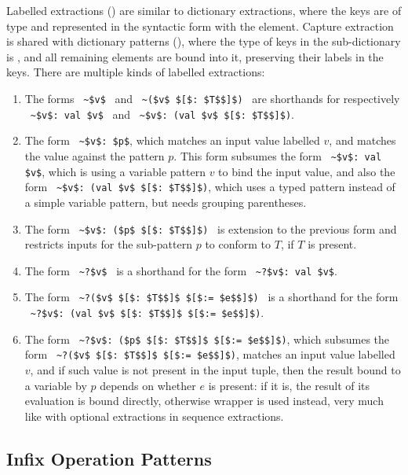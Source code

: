 Labelled extractions () are similar to dictionary extractions, where the keys are of type  and represented in the syntactic form with the  element. Capture extraction is shared with dictionary patterns (), where the type of keys in the sub-dictionary is , and all remaining elements are bound into it, preserving their labels in the keys. There are multiple kinds of labelled extractions: 
\begin{enumerate}
  \item The forms ~\lstinline!~$v$!~ and ~\lstinline!~($v$ $[$: $T$$]$)!~ are shorthands for respectively ~\lstinline!~$v$: val $v$!~ and ~\lstinline!~$v$: (val $v$ $[$: $T$$]$)!. 
  \item The form ~\lstinline!~$v$: $p$!, which matches an input value labelled $v$, and matches the value against the pattern $p$. This form subsumes the form ~\lstinline!~$v$: val $v$!, which is using a variable pattern $v$ to bind the input value, and also the form ~\lstinline!~$v$: (val $v$ $[$: $T$$]$)!, which uses a typed pattern instead of a simple variable pattern, but needs grouping parentheses. 
  \item The form ~\lstinline!~$v$: ($p$ $[$: $T$$]$)!~ is extension to the previous form and restricts inputs for the sub-pattern $p$ to conform to $T$, if $T$ is present. 
  \item The form ~\lstinline!~?$v$!~ is a shorthand for the form ~\lstinline!~?$v$: val $v$!. 
  \item The form ~\lstinline!~?($v$ $[$: $T$$]$ $[$:= $e$$]$)!~ is a shorthand for the form ~\lstinline!~?$v$: (val $v$ $[$: $T$$]$ $[$:= $e$$]$)!. 
  \item The form ~\lstinline!~?$v$: ($p$ $[$: $T$$]$ $[$:= $e$$]$)!, which subsumes the form ~\lstinline!~?($v$ $[$: $T$$]$ $[$:= $e$$]$)!, matches an input value labelled $v$, and if such value is not present in the input tuple, then the result bound to a variable by $p$ depends on whether $e$ is present: if it is, the result of its evaluation is bound directly, otherwise  wrapper is used instead, very much like with optional extractions in sequence extractions. 
\end{enumerate}





\subsection{Infix Operation Patterns}
\label{sec:infix-patterns}


